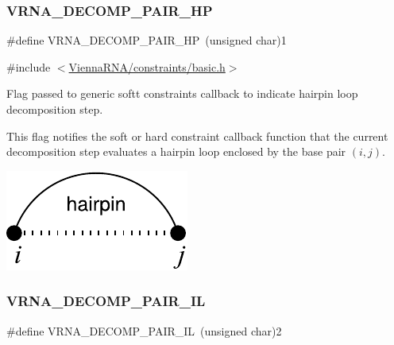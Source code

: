 \subsubsection{\texorpdfstring{V\+R\+N\+A\+\_\+\+D\+E\+C\+O\+M\+P\+\_\+\+P\+A\+I\+R\+\_\+\+HP}{VRNA\_DECOMP\_PAIR\_HP}}
{\footnotesize\ttfamily \#define V\+R\+N\+A\+\_\+\+D\+E\+C\+O\+M\+P\+\_\+\+P\+A\+I\+R\+\_\+\+HP~(unsigned char)1}



{\ttfamily \#include $<$\hyperlink{constraints_2basic_8h}{Vienna\+R\+N\+A/constraints/basic.\+h}$>$}



Flag passed to generic softt constraints callback to indicate hairpin loop decomposition step. 

This flag notifies the soft or hard constraint callback function that the current decomposition step evaluates a hairpin loop enclosed by the base pair $(i,j)$.

 
\begin{DoxyImageNoCaption}
  \mbox{\includegraphics[width=\textwidth,height=\textheight/2,keepaspectratio=true]{decomp_hp}}
\end{DoxyImageNoCaption}
 \mbox{\label{group__constraints_gaeab04f34d7730cff2d651d782f95d857}} 
\subsubsection{\texorpdfstring{V\+R\+N\+A\+\_\+\+D\+E\+C\+O\+M\+P\+\_\+\+P\+A\+I\+R\+\_\+\+IL}{VRNA\_DECOMP\_PAIR\_IL}}
{\footnotesize\ttfamily \#define V\+R\+N\+A\+\_\+\+D\+E\+C\+O\+M\+P\+\_\+\+P\+A\+I\+R\+\_\+\+IL~(unsigned char)2}



